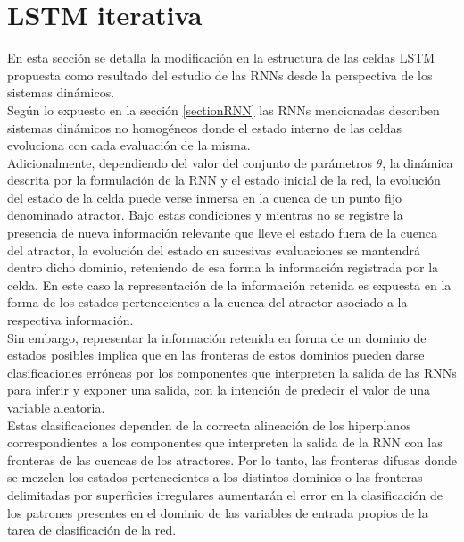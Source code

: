 \documentclass{article}
\begin{document}
	\pagebreak
	\section{LSTM iterativa}\label{sectionIterativeLSTM}
	En esta sección se detalla la modificación en la estructura de las celdas LSTM propuesta como resultado del estudio de las RNNs desde la perspectiva de los sistemas dinámicos.\\
	Según lo expuesto en la sección \ref{sectionRNN} las RNNs mencionadas describen sistemas dinámicos no homogéneos donde el estado interno de las celdas evoluciona con cada evaluación de la misma.\\
	Adicionalmente, dependiendo del valor del conjunto de parámetros $\theta$, la dinámica descrita por la formulación de la RNN y el estado inicial de la red, la evolución del estado de la celda puede verse inmersa en la cuenca de un punto fijo denominado atractor. Bajo estas condiciones y mientras no se registre la presencia de nueva información relevante que lleve el estado fuera de la cuenca del atractor, la evolución del estado en sucesivas evaluaciones se mantendrá dentro dicho dominio, reteniendo de esa forma la información registrada por la celda. En este caso la representación de la información retenida es expuesta en la forma de los estados pertenecientes a la cuenca del atractor asociado a la respectiva información.\\
	
	Sin embargo, representar la información retenida en forma de un dominio de estados posibles implica que en las fronteras de estos dominios pueden darse clasificaciones erróneas por los componentes que interpreten la salida de las RNNs para inferir y exponer una salida, con la intención de predecir el valor de una variable aleatoria.\\
	Estas clasificaciones dependen de la correcta alineación de los hiperplanos correspondientes a los componentes que interpreten la salida de la RNN con las fronteras de las cuencas de los atractores. Por lo tanto, las fronteras difusas	donde se mezclen los estados pertenecientes a los distintos dominios o las fronteras delimitadas por superficies irregulares aumentarán el error en la clasificación de los patrones presentes en el dominio de las variables de entrada propios de la tarea de clasificación de la red.\\
	
\end{document}
